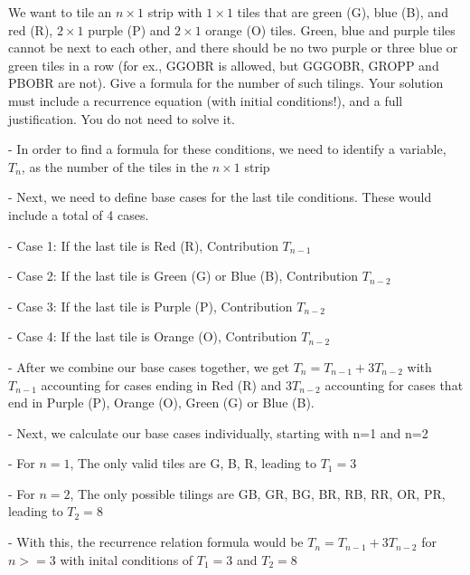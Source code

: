 \documentclass{article}
\begin{document}

\vskip 0.1in

\begin{problem}
We want to tile an $n\times 1$ strip with $1\times 1$ tiles that are green (G), blue (B), and red (R), $2\times 1$ purple (P) and $2\times 1$ orange (O) tiles. Green, blue and purple tiles cannot be next to each other, and there should be no two purple or three blue or green tiles in a row (for ex., GGOBR is allowed, but GGGOBR, GROPP and PBOBR are not). Give a formula for the number of such tilings. Your solution must include a recurrence equation (with initial conditions!), and a full justification. You do not need to solve it. 

\vspace{0.1in} - In order to find a formula for these conditions, we need to identify a variable, $T_n$, as the number of the tiles in the $n\times 1$ strip

\vspace{0.1in} - Next, we need to define base cases for the last tile conditions. These would include a total of 4 cases. 

\vspace{0.1in}\indent\indent - Case 1: If the last tile is Red (R), Contribution $T_{n-1}$

\vspace{0.1in}\indent\indent - Case 2: If the last tile is Green (G) or Blue (B), Contribution $T_{n-2}$

\vspace{0.1in}\indent\indent - Case 3: If the last tile is Purple (P), Contribution $T_{n-2}$

\vspace{0.1in}\indent\indent - Case 4: If the last tile is Orange (O), Contribution $T_{n-2}$

\vspace{0.1in} - After we combine our base cases together, we get $T_n=T_{n-1}+3T_{n-2}$ with $T_{n-1}$ accounting for cases ending in Red (R) and $3T_{n-2}$ accounting for cases that end in Purple (P), Orange (O), Green (G) or Blue (B).

\vspace{0.1in} - Next, we calculate our base cases individually, starting with n=1 and n=2

\vspace{0.1in}\indent\indent - For $n=1$, The only valid tiles are G, B, R, leading to $T_1=3$

\vspace{0.1in}\indent\indent - For $n=2$, The only possible tilings are GB, GR, BG, BR, RB, RR, OR, PR, leading to $T_2=8$

\vspace{0.1in} - With this, the recurrence relation formula would be $T_n=T_{n-1}+3T_{n-2}$ for $n>=3$ with inital conditions of $T_1=3$ and $T_2=8$

\end{problem}
\end{document}
